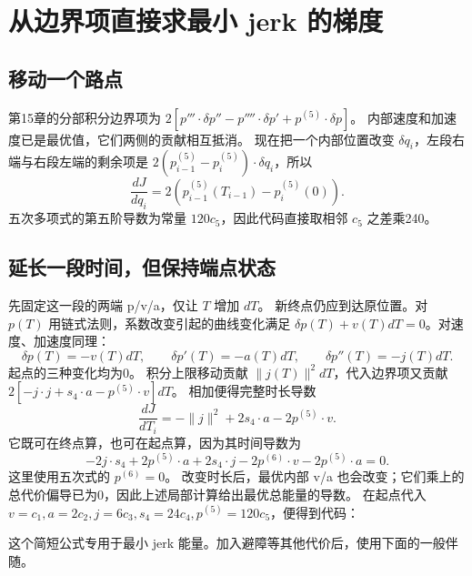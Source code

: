\section{从边界项直接求最小 jerk 的梯度}
\subsection{移动一个路点}
第15章的分部积分边界项为
$2[p'''\cdot\delta p''-p''''\cdot\delta p'+p^{(5)}\cdot\delta p]$。
内部速度和加速度已是最优值，它们两侧的贡献相互抵消。
现在把一个内部位置改变 $\delta q_i$，左段右端与右段左端的剩余项是
$2(p_{i-1}^{(5)}-p_i^{(5)})\cdot\delta q_i$，所以
\begin{equation}
 \frac{dJ}{dq_i}=2\left(p_{i-1}^{(5)}(T_{i-1})-p_i^{(5)}(0)\right).
\end{equation}
五次多项式的第五阶导数为常量 $120c_5$，因此代码直接取相邻 $c_5$ 之差乘240。

\subsection{延长一段时间，但保持端点状态}
先固定这一段的两端 p/v/a，仅让 $T$ 增加 $dT$。
新终点仍应到达原位置。对 $p(T)$ 用链式法则，系数改变引起的曲线变化满足
$\delta p(T)+v(T)dT=0$。对速度、加速度同理：
\[
 \delta p(T)=-v(T)dT,\qquad
 \delta p'(T)=-a(T)dT,\qquad
 \delta p''(T)=-j(T)dT.
\]
起点的三种变化均为0。
积分上限移动贡献 $\|j(T)\|^2dT$，代入边界项又贡献
$2[-j\cdot j+s_4\cdot a-p^{(5)}\cdot v]dT$。
相加便得完整时长导数
\begin{equation}
 \frac{dJ}{dT_i}=-\|j\|^2+2s_4\cdot a-2p^{(5)}\cdot v.
 \label{eq:spline-energy-time}
\end{equation}
它既可在终点算，也可在起点算，因为其时间导数为
\[
 -2j\cdot s_4+2p^{(5)}\cdot a+2s_4\cdot j
 -2p^{(6)}\cdot v-2p^{(5)}\cdot a=0.
\]
这里使用五次式的 $p^{(6)}=0$。
改变时长后，最优内部 v/a 也会改变；它们乘上的总代价偏导已为0，因此上述局部计算给出最优总能量的导数。
在起点代入 $v=c_1,a=2c_2,j=6c_3,s_4=24c_4,p^{(5)}=120c_5$，便得到代码：
\par\noindent\begin{minipage}{\linewidth}

\end{minipage}\par
这个简短公式专用于最小 jerk 能量。加入避障等其他代价后，使用下面的一般伴随。

